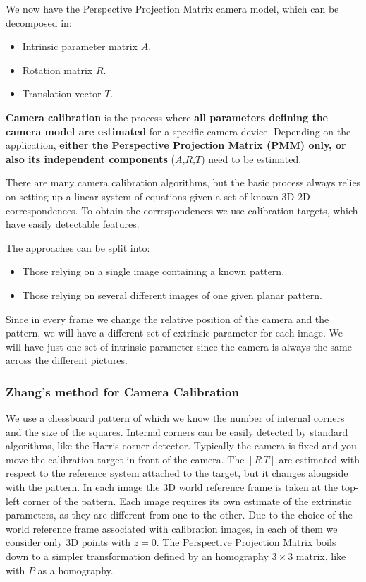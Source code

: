 We now have the Perspective Projection Matrix camera model, which can be decomposed in:
\begin{itemize}
  \item Intrinsic parameter matrix $A$.
  \item Rotation matrix $R$.
  \item Translation vector $T$.
\end{itemize}

\textbf{Camera calibration} is the process where \textbf{all parameters defining the camera model are estimated} for a specific camera device.
Depending on the application, \textbf{either the Perspective Projection Matrix (PMM) only, or also its independent components} ($A$,$R$,$T$) need to be estimated.

There are many camera calibration algorithms, but the basic process always relies on setting up a linear system of equations given a set of known 3D-2D correspondences.
To obtain the correspondences we use calibration targets, which have easily detectable features.

The approaches can be split into:
\begin{itemize}
  \item Those relying on a single image containing a known pattern.
  \item Those relying on several different images of one given planar pattern.
\end{itemize}

Since in every frame we change the relative position of the camera and the pattern, we will have a different set of extrinsic parameter for each image.
We will have just one set of intrinsic parameter since the camera is always the same across the different pictures.

\subsubsection{Zhang's method for Camera Calibration}

We use a chessboard pattern of which we know the number of internal corners and the size of the squares.
Internal corners can be easily detected by standard algorithms, like the Harris corner detector.
Typically the camera is fixed and you move the calibration target in front of the camera.
The $[R\,T]$ are estimated with respect to the reference system attached to the target, but it changes alongside with the pattern.
In each image the 3D world reference frame is taken at the top-left corner of the pattern.
Each image requires its own estimate of the extrinstic parameters, as they are different from one to the other.
Due to the choice of the world reference frame associated with calibration images, in each of them we consider only 3D points with $z=0$.
The Perspective Projection Matrix boils down to a simpler transformation defined by an homography $3\times 3$ matrix, like with $P$ as a homography.

